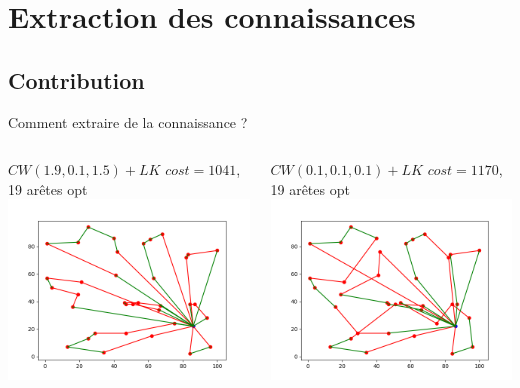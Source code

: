 \documentclass{beamer}
\begin{document}
\section{Extraction des connaissances}

\subsection{Contribution}

\begin{frame}{Comment extraire de la connaissance ?}
 \begin{columns}[t]
  \begin{column}{4cm}
  	\centering
  	$CW(1.9,0.1,1.5)+LK$ 
  	$cost = 1041$, 19 arêtes opt
  	\includegraphics[scale=0.2]{edges190115.png}
	
	
  \end{column}
  
    \begin{column}{4cm}
  	\centering
  	$CW(0.1,0.1,0.1)+LK$ $cost = 1170$, 19 arêtes opt
	\includegraphics[scale=0.2]{edges101010.png}


\end{column}
\end{columns}
\end{frame}
\end{document}
